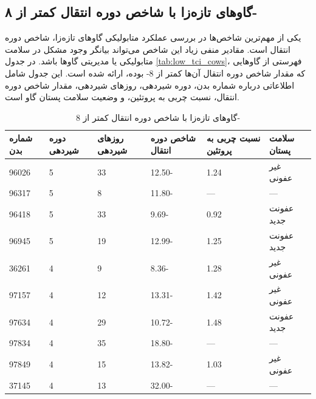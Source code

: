 \subsection{گاو‌های تازه‌زا با شاخص دوره انتقال کمتر از ۸-}

یکی از مهم‌ترین شاخص‌ها در بررسی عملکرد متابولیکی گاوهای تازه‌زا، شاخص دوره انتقال است. مقادیر منفی زیاد این شاخص می‌تواند بیانگر وجود مشکل در سلامت متابولیکی یا مدیریتی گاوها باشد. در جدول \ref{tab:low_tci_cows}، فهرستی از گاوهایی که مقدار شاخص دوره انتقال آن‌ها کمتر از \num{8}- بوده، ارائه شده است. این جدول شامل اطلاعاتی درباره شماره بدن، دوره شیردهی، روزهای شیردهی، مقدار شاخص دوره انتقال، نسبت چربی به پروتئین، و وضعیت سلامت پستان گاو است.

\begin{table}[H]
	\centering
	\caption{گاوهای تازه‌زا با شاخص دوره انتقال کمتر از \num{8}-}
	\renewcommand{\arraystretch}{1.3}
	\begin{tabular}{
			 >{\centering\arraybackslash}m{2.8cm}
			 >{\centering\arraybackslash}m{1.8cm}
			 >{\centering\arraybackslash}m{1.8cm}
			 >{\centering\arraybackslash}m{2.2cm}
			 >{\centering\arraybackslash}m{2.8cm}
			 >{\centering\arraybackslash}m{2.5cm} 
		}
		\toprule
		\textbf{شماره بدن}
		& \textbf{دوره شیردهی}
		& \textbf{روزهای شیردهی}
		& \textbf{شاخص دوره انتقال}
		& \textbf{نسبت چربی به پروتئین}
		& \textbf{سلامت پستان} \\
		\midrule
		\num{96026} & \num{5} & \num{33} & \num{12.50}- & \num{1.24} & غیر عفونی \\
		\num{96317} & \num{5} & \num{8}  & \num{11.80}- & —         & — \\
		\num{96418} & \num{5} & \num{33} & \num{9.69}-  & \num{0.92} & عفونت جدید \\
		\num{96945} & \num{5} & \num{19} & \num{12.99}- & \num{1.25} & عفونت جدید \\
		\num{36261} & \num{4} & \num{9}  & \num{8.36}-  & \num{1.28} & غیر عفونی \\
		\num{97157} & \num{4} & \num{12} & \num{13.31}- & \num{1.42} & غیر عفونی \\
		\num{97634} & \num{4} & \num{29} & \num{10.72}- & \num{1.48} & عفونت جدید \\
		\num{97834} & \num{4} & \num{35} & \num{18.80}- & —         & — \\
		\num{97849} & \num{4} & \num{15} & \num{13.82}- & \num{1.03} & غیر عفونی \\
		\num{37145} & \num{4} & \num{13} & \num{32.00}- & —         & — \\

\end{tabular}
\end{table}
